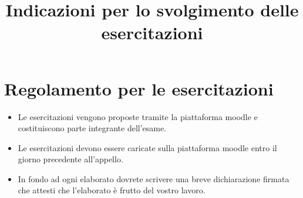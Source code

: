 \documentclass[12pt]{article}
\author{}
\title{Indicazioni per lo svolgimento delle esercitazioni}
\begin{document}
\maketitle
\tableofcontents

\vfill\newpage
\section{Regolamento per le esercitazioni}
\begin{itemize}
\item Le esercitazioni vengono proposte tramite la piattaforma moodle e costituiscono parte integrante dell'esame.

  \item Le esercitazioni devono essere caricate sulla piattaforma moodle entro il giorno precedente all'appello.

\item  In fondo ad ogni elaborato dovrete scrivere una breve dichiarazione firmata che attesti che l'elaborato \`e frutto del vostro lavoro.

  \end{itemize}
\end{document}
